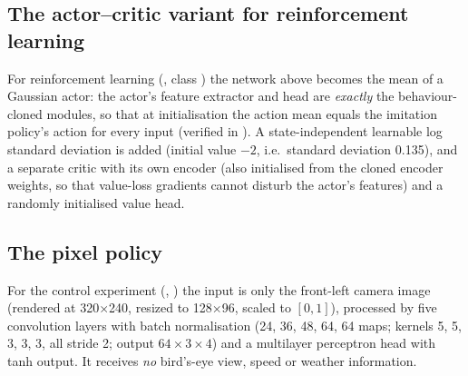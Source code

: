 \subsection{The actor--critic variant for reinforcement learning}
For reinforcement learning (, class ) the network above becomes the mean of a Gaussian actor: the actor's feature extractor and head are \emph{exactly} the behaviour-cloned modules, so that at initialisation the action mean equals the imitation policy's action for every input (verified in ).
A state-independent learnable log standard deviation is added (initial value $-2$, i.e.\ standard deviation 0.135), and a separate critic with its own encoder (also initialised from the cloned encoder weights, so that value-loss gradients cannot disturb the actor's features) and a randomly initialised value head.

\subsection{The pixel policy}
For the control experiment (, ) the input is only the front-left camera image (rendered at 320$\times$240, resized to 128$\times$96, scaled to $[0,1]$), processed by five convolution layers with batch normalisation (24, 36, 48, 64, 64 maps; kernels 5, 5, 3, 3, 3, all stride 2; output $64\times3\times4$) and a multilayer perceptron head with tanh output.
It receives \emph{no} bird's-eye view, speed or weather information.

